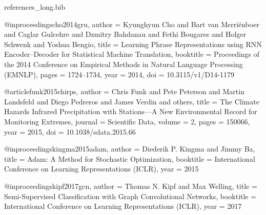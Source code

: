 \begin{filecontents*}[overwrite]{references_long.bib}

@inproceedings{cho2014gru,
  author    = {Kyunghyun Cho and Bart van Merri{\"e}nboer and Caglar Gulcehre and Dzmitry Bahdanau and Fethi Bougares and Holger Schwenk and Yoshua Bengio},
  title     = {Learning Phrase Representations using {RNN} Encoder--Decoder for Statistical Machine Translation},
  booktitle = {Proceedings of the 2014 Conference on Empirical Methods in Natural Language Processing (EMNLP)},
  pages     = {1724--1734},
  year      = {2014},
  doi       = {10.3115/v1/D14-1179}
}

@article{funk2015chirps,
  author  = {Chris Funk and Pete Peterson and Martin Landsfeld and Diego Pedreros and James Verdin and others},
  title   = {The Climate Hazards Infrared Precipitation with Stations---A New Environmental Record for Monitoring Extremes},
  journal = {Scientific Data},
  volume  = {2},
  pages   = {150066},
  year    = {2015},
  doi     = {10.1038/sdata.2015.66}
}

@inproceedings{kingma2015adam,
  author    = {Diederik P. Kingma and Jimmy Ba},
  title     = {Adam: A Method for Stochastic Optimization},
  booktitle = {International Conference on Learning Representations (ICLR)},
  year      = {2015}
}

@inproceedings{kipf2017gcn,
  author    = {Thomas N. Kipf and Max Welling},
  title     = {Semi-Supervised Classification with Graph Convolutional Networks},
  booktitle = {International Conference on Learning Representations (ICLR)},
  year      = {2017}
}


\end{filecontents*}
